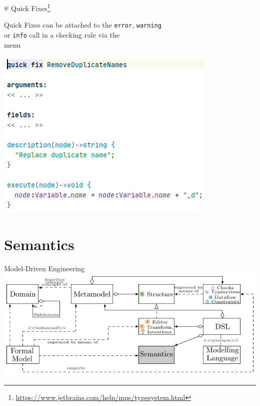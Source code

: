 	\begin{frame}{\includegraphics[height=0.25cm]{graphics/quickfix.png} Quick Fixes\footnote{\url{https://www.jetbrains.com/help/mps/typesystem.html}}}
		\begin{minipage}{0.52\textwidth}
			Quick Fixes can be attached to the \texttt{error}, \texttt{warning}\\
			or \texttt{info} call in a checking rule via the \\
			\menu{\workshopinspector{}} menu
		\end{minipage}
		\begin{minipage}{0.4\textwidth}
			\includegraphics[height=0.8\textheight]{illustrations/quickfix.png}
		\end{minipage}
	\end{frame}

	\section{Semantics}
	
	\begin{frame}{Model-Driven Engineering}
		\includegraphics[width=\textwidth]{tikz/mdsd_concept_7.pdf}
	\end{frame}
	
